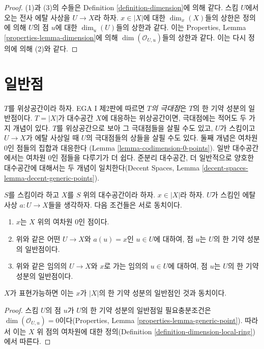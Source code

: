 \begin{proof}
(1)과 (3)의 수들은 Definition \ref{definition-dimension}에 의해 같다.
스킴 $U$에서 오는 전사 에탈 사상을 $U \to X$라 하자.
$x \in |X|$에 대한 $\dim_x(X)$들의 상한은 정의에 의해 $U$의 점
$u$에 대한 $\dim_u(U)$들의 상한과 같다. 이는 Properties, Lemma
\ref{properties-lemma-dimension}에 의해 $\dim(\mathcal{O}_{U, u})$들의
상한과 같다. 이는 다시 정의에 의해 (2)와 같다.
\end{proof}




\section{일반점}
\label{section-generic-points}

\noindent
$T$를 위상공간이라 하자. EGA I 제2판에 따르면
{\it $T$의 극대점}은 $T$의 한 기약 성분의 일반점이다.
$T = |X|$가 대수공간 $X$에 대응하는 위상공간이면, 극대점에는 적어도
두 가지 개념이 있다. $T$를 위상공간으로 보아 그 극대점들을 살필 수도 있고,
$U$가 스킴이고 $U \to X$가 에탈 사상일 때 $U$의 극대점들의 상들을
살필 수도 있다. 둘째 개념은 여차원 $0$인 점들의 집합과 대응한다
(Lemma \ref{lemma-codimension-0-points}). 일반 대수공간에서는 여차원
$0$인 점들을 다루기가 더 쉽다. 준분리 대수공간, 더 일반적으로 양호한
대수공간에 대해서는 두 개념이 일치한다(Decent Spaces, Lemma
\ref{decent-spaces-lemma-decent-generic-points}).

\begin{lemma}
\label{lemma-codimension-0-points}
$S$를 스킴이라 하고 $X$를 $S$ 위의 대수공간이라 하자.
$x \in |X|$라 하자. $U$가 스킴인 에탈 사상 $a : U \to X$들을
생각하자. 다음 조건들은 서로 동치이다.
\begin{enumerate}
\item $x$는 $X$ 위의 여차원 $0$인 점이다.
\item 위와 같은 어떤 $U \to X$와 $a(u) = x$인 $u \in U$에 대하여,
점 $u$는 $U$의 한 기약 성분의 일반점이다.
\item 위와 같은 임의의 $U \to X$와 $x$로 가는 임의의 $u \in U$에 대하여,
점 $u$는 $U$의 한 기약 성분의 일반점이다.
\end{enumerate}
$X$가 표현가능하면 이는 $x$가 $|X|$의 한 기약 성분의 일반점인 것과
동치이다.
\end{lemma}

\begin{proof}
스킴 $U$의 점 $u$가 $U$의 한 기약 성분의 일반점일 필요충분조건은
$\dim(\mathcal{O}_{U, u}) = 0$이다(Properties, Lemma
\ref{properties-lemma-generic-point}). 따라서 이는 $X$ 위 점의 여차원에
대한 정의(Definition \ref{definition-dimension-local-ring})에서 따른다.
\end{proof}

